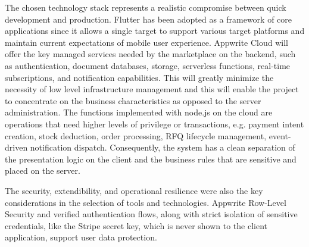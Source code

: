 The chosen technology stack represents a realistic compromise between quick development and production. Flutter has been adopted as a framework of core applications since it allows a single target to support various target platforms and maintain current expectations of mobile user experience. Appwrite Cloud will offer the key managed services needed by the marketplace on the backend, such as authentication, document databases, storage, serverless functions, real-time subscriptions, and notification capabilities. This will greatly minimize the necessity of low level infrastructure management and this will enable the project to concentrate on the business characteristics as opposed to the server administration. The functions implemented with node.js on the cloud are operations that need higher levels of privilege or transactions, e.g. payment intent creation, stock deduction, order processing, RFQ lifecycle management, event-driven notification dispatch. Consequently, the system has a clean separation of the presentation logic on the client and the business rules that are sensitive and placed on the server.

The security, extendibility, and operational resilience were also the key considerations in the selection of tools and technologies. Appwrite Row-Level Security and verified authentication flows, along with strict isolation of sensitive credentials, like the Stripe secret key, which is never shown to the client application, support user data protection. 

